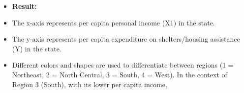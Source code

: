 \documentclass[12pt,letterpaper]{article}
\begin{document}
\begin{itemize}
\begin{figure}[H]
\end{figure}
\begin{itemize}
	\item\textbf{ Result:}
	\item The x-axis represents per capita personal income (X1) in the state.
	\item The y-axis represents per capita expenditure on shelters/housing assistance (Y) in the state.
	\item Different colors and shapes are used to differentiate between regions (1 = Northeast, 2 = North Central, 3 = South, 4 = West). In the context of Region 3 (South), with its lower per capita income,
\end{itemize}
\end{itemize}
\end{document}
